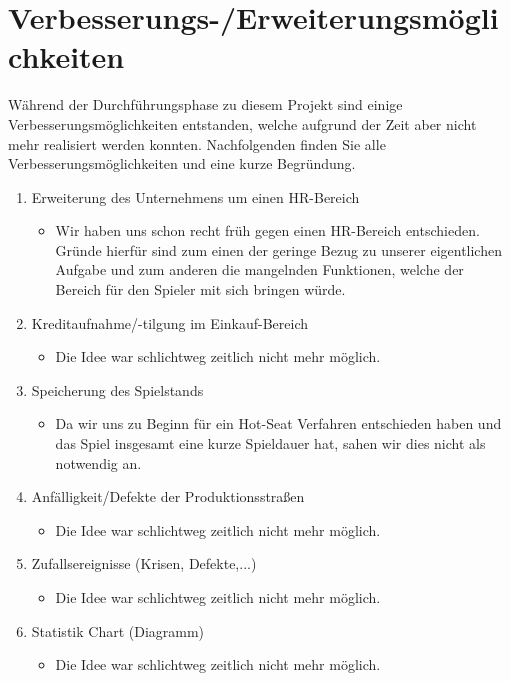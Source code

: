 \clearpage
\chapter{Verbesserungs-/Erweiterungsmöglichkeiten}
Während der Durchführungsphase zu diesem Projekt sind einige Verbesserungsmöglichkeiten entstanden, welche aufgrund der Zeit aber nicht mehr realisiert werden konnten. Nachfolgenden finden Sie alle Verbesserungsmöglichkeiten und eine kurze Begründung.
\begin{enumerate}
	\item Erweiterung des Unternehmens um einen HR-Bereich
\begin{itemize}
	\item Wir haben uns schon recht früh gegen einen HR-Bereich entschieden. Gründe hierfür sind zum einen der geringe Bezug zu unserer eigentlichen Aufgabe und zum anderen die mangelnden Funktionen, welche der Bereich für den Spieler mit sich bringen würde. 	
\end{itemize} 
	\item Kreditaufnahme/-tilgung im Einkauf-Bereich
\begin{itemize}
	\item Die Idee war schlichtweg zeitlich nicht mehr möglich.
\end{itemize} 
	\item Speicherung des Spielstands
\begin{itemize}
	\item Da wir uns zu Beginn für ein Hot-Seat Verfahren entschieden haben und das Spiel insgesamt eine kurze Spieldauer hat, sahen wir dies nicht als notwendig an.
\end{itemize} 
	\item Anfälligkeit/Defekte der Produktionsstraßen
\begin{itemize}
	\item Die Idee war schlichtweg zeitlich nicht mehr möglich.
\end{itemize} 
	\item Zufallsereignisse (Krisen, Defekte,...)
\begin{itemize}
	\item Die Idee war schlichtweg zeitlich nicht mehr möglich.
\end{itemize} 
	\item Statistik Chart (Diagramm) 
\begin{itemize}
	\item Die Idee war schlichtweg zeitlich nicht mehr möglich.
\end{itemize} 	
\end{enumerate}




